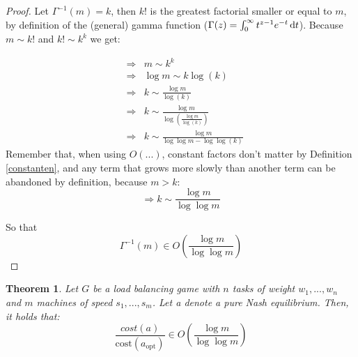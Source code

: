 \documentclass[a4paper,11pt]{article}
\newtheorem{theorem}{Theorem}[section]
\newcommand{\cost}{\text{cost}}
\newcommand{\opt}{\text{opt}}
\begin{document}
\begin{proof}
Let $\Gamma^{-1}(m) = k$, then $k!$ is the greatest factorial smaller or equal to $m$, by definition of the (general) gamma function ($\Gamma(z) = \int_0^\infty  t^{z-1} e^{-t}\,{\rm d}t$). Because $m \sim k!$ and $k! \sim k^k$ we get:

\begin{eqnarray*}
&\Rightarrow& m \sim k^{k} \\
&\Rightarrow& \log m \sim k\log(k) \\
&\Rightarrow& k \sim \frac{\log m}{\log(k)}\\
&\Rightarrow& k \sim \frac{\log m}{\log(\frac{\log m}{\log (k)})}\\
&\Rightarrow& k \sim \frac{\log m}{\log\log m - \log\log (k)}
\end{eqnarray*}
Remember that, when using $O(...)$, constant factors don't matter by Definition \ref{constanten}, and any term that grows more slowly than another term can be abandoned by definition, because $m > k$:
$$\Rightarrow k \sim \frac{\log m}{\log \log m}$$

So that
$$\Gamma^{-1}(m) \in O\left(\frac{\log m}{\log \log m}\right)$$
\end{proof}

\begin{theorem}\label{puur}
Let $G$ be a load balancing game with $n$ tasks of weight $w_1,...,w_n$ and $m$ machines of speed $s_1, ..., s_m$. Let \emph{a} denote a pure Nash equilibrium. Then, it holds that:
$$\frac{cost(a)}{\cost(a_{\opt})} \in O\left(\frac{\log m}{\log \log m}\right)$$
\end{theorem}
\end{document}
